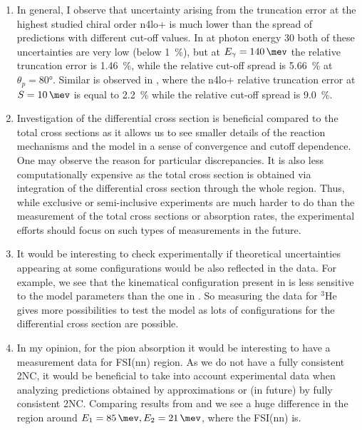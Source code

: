 \begin{enumerate}
    \item In general, I observe that uncertainty arising from the truncation error at the highest
    studied chiral order \gls{n4lo+} is much lower than the spread of predictions with different
    cut-off values. In  at photon energy \SI{30}{\mev} both of these
    uncertainties are very low (below \SI{1}{\percent}), but at $E_\gamma=\SI{140}{\mev}$
    the relative truncation error is \SI{1.46}{\percent}, while the relative cut-off spread is 
    \SI{5.66}{\percent} at $\theta_p= \ang{80}$.
    Similar is observed in , where the \gls{n4lo+} relative 
    truncation error at $S=\SI{10}{\mev}$ is equal to \SI{2.2}{\percent} while
    the relative cut-off spread is \SI{9.0}{\percent}.
    \item Investigation of the differential cross section is beneficial compared to the total cross sections as it allows us to see smaller details of the reaction mechanisms and the model in a sense of convergence and cutoff dependence. One may observe the reason for particular discrepancies.
    It is also less computationally expensive as the total cross section is obtained via integration of the differential cross section through the whole region.
    Thus, while exclusive or semi-inclusive experiments are much harder to do than the measurement of the total
    cross sections or absorption rates, the experimental efforts should focus on such types of measurements in the future. 
    \item It would be interesting to check experimentally if theoretical uncertainties appearing at some configurations would be also reflected in the data. For example, we see that the kinematical configuration present in  is less sensitive to the model parameters than the one in . So measuring the data for $^3$He gives more possibilities to test the model as lots of configurations for the differential cross section are possible.
    \item In my opinion, for the pion absorption it would be interesting to have a measurement data for FSI(nn) region. As we do not have a fully consistent 2NC, it would be beneficial to take into account experimental data when analyzing predictions obtained by approximations or (in future) by fully consistent 2NC. Comparing results from   and  we see a huge difference in the region around $E_1=\SI{85}{\mev}, E_2 = \SI{21}{\mev}$, where the FSI(nn) is.

\end{enumerate}
